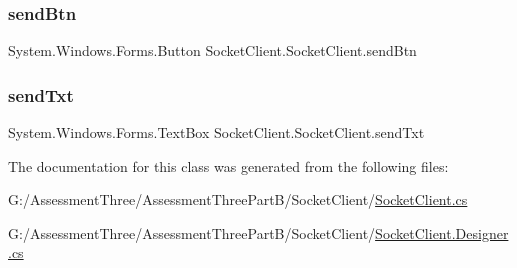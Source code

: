 \mbox{\label{class_socket_client_1_1_socket_client_ae39ef5159c71a2e983b6c19d3548622c}} 
\subsubsection{\texorpdfstring{send\+Btn}{sendBtn}}
{\footnotesize\ttfamily System.\+Windows.\+Forms.\+Button Socket\+Client.\+Socket\+Client.\+send\+Btn\hspace{0.3cm}{\ttfamily [private]}}

\mbox{\label{class_socket_client_1_1_socket_client_ae178c12147d21c828bb8a444267289ee}} 
\subsubsection{\texorpdfstring{send\+Txt}{sendTxt}}
{\footnotesize\ttfamily System.\+Windows.\+Forms.\+Text\+Box Socket\+Client.\+Socket\+Client.\+send\+Txt\hspace{0.3cm}{\ttfamily [private]}}



The documentation for this class was generated from the following files\+:\begin{DoxyCompactItemize}
\item 
G\+:/\+Assessment\+Three/\+Assessment\+Three\+Part\+B/\+Socket\+Client/\hyperlink{_socket_client_8cs}{Socket\+Client.\+cs}\item 
G\+:/\+Assessment\+Three/\+Assessment\+Three\+Part\+B/\+Socket\+Client/\hyperlink{_socket_client_8_designer_8cs}{Socket\+Client.\+Designer.\+cs}\end{DoxyCompactItemize}
